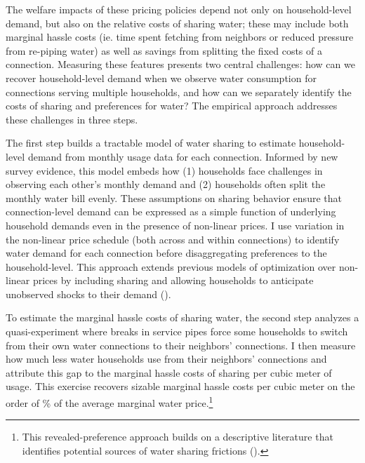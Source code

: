\documentclass[12pt]{article}
\begin{document}
The welfare impacts of these pricing policies depend not only on household-level demand, but also on the relative costs of sharing water; these may include both marginal hassle costs (ie. time spent fetching from neighbors or reduced pressure from re-piping water) as well as savings from splitting the fixed costs of a connection.  Measuring these features presents two central challenges: how can we recover household-level demand when we observe water consumption for connections serving multiple households, and how can we separately identify the costs of sharing and preferences for water?  The empirical approach addresses these challenges in three steps. 

The first step builds a tractable model of water sharing to estimate household-level demand from monthly usage data for each connection.  Informed by new survey evidence, this model embeds how (1) households face challenges in observing each other's monthly demand and (2) households often split the monthly water bill evenly.  These assumptions on sharing behavior ensure that connection-level demand can be expressed as a simple function of underlying household demands even in the presence of non-linear prices.  I use variation in the non-linear price schedule (both across and within connections) to identify water demand for each connection before disaggregating preferences to the household-level.  This approach extends previous models of optimization over non-linear prices by including sharing and allowing households to anticipate unobserved shocks to their demand (\cite{moffitt1986econometrics,burtless1978effect}).

To estimate the marginal hassle costs of sharing water, the second step analyzes a quasi-experiment where breaks in service pipes force some households to switch from their own water connections to their neighbors' connections.  I then measure how much less water households use from their neighbors' connections and attribute this gap to the marginal hassle costs of sharing per cubic meter of usage.  This exercise recovers sizable marginal hassle costs per cubic meter on the order of \unskip\% of the average marginal water price.\footnote{This revealed-preference approach builds on a descriptive literature that identifies potential sources of water sharing frictions (\cite{whittington1992possible,nauges2006water}).}
\end{document}
